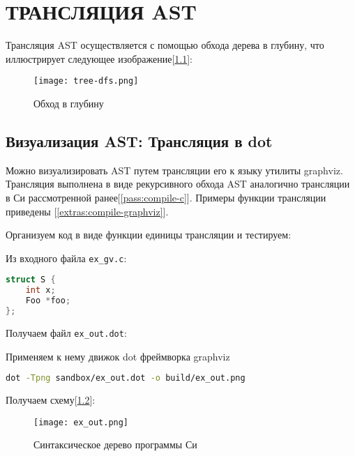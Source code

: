 \chapter{ТРАНСЛЯЦИЯ AST}

Трансляция AST осуществляется с помощью обхода дерева в глубину, что иллюстрирует следующее изображение[\ref{pass:compile-c:dfs-diag}]:

\begin{figure}[h!]
    \texttt{[image: tree-dfs.png]}
    \centering
    \caption{Обход в глубину}
    \label{pass:compile-c:dfs-diag}
\end{figure}
\FloatBarrier

\section{Визуализация AST: Трансляция в dot}
\label{pass:compile-dot}

Можно визуализировать AST путем трансляции его к языку  утилиты graphviz.
Трансляция выполнена в виде рекурсивного обхода AST аналогично трансляции в Си рассмотренной ранее[\ref{pass:compile-c}].
Примеры функции трансляции приведены [\ref{extras:compile-graphviz}].

Организуем код в виде функции единицы трансляции и тестируем:



Из входного файла \verb|ex_gv.c|:

\begin{lstlisting}[language=c, caption={ex\_gv.c}]
struct S {
    int x;
    Foo *foo;
};
\end{lstlisting}

Получаем файл \verb|ex_out.dot|:


\clearpage
Применяем к нему движок dot фреймворка graphviz
\begin{lstlisting}[language=bash]
dot -Tpng sandbox/ex_out.dot -o build/ex_out.png
\end{lstlisting}

Получаем схему[\ref{graphviz:struct}]:

\begin{figure}[h!]
    \texttt{[image: ex\_out.png]}
    \centering
    \caption{Синтаксическое дерево программы Си}
    \label{graphviz:struct}
\end{figure}

